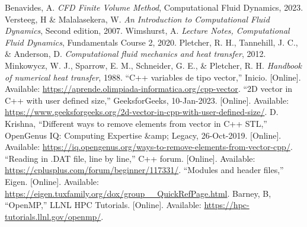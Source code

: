 \documentclass[article,latterpaper]{article}
\begin{document}
\begin{thebibliography}{}
 Benavides, A. \textit{CFD Finite Volume Method}, Computational Fluid Dynamics, 2023.
 Versteeg, H \& Malalasekera, W. \textit{An Introduction to Computational Fluid Dynamics}, Second edition, 2007.
 Wimshurst, A. \textit{Lecture Notes, Computational Fluid Dynamics}, Fundamentals Course 2, 2020.
 Pletcher, R. H., Tannehill, J. C., \& Anderson, D. \textit{Computational fluid mechanics and heat transfer}, 2012.
 Minkowycz, W. J., Sparrow, E. M., Schneider, G. E., \& Pletcher, R. H. \textit{Handbook of numerical heat transfer}, 1988.
 “C++ variables de tipo vector,” Inicio. [Online]. Available: \url{https://aprende.olimpiada-informatica.org/cpp-vector}.
 “2D vector in C++ with user defined size,” GeeksforGeeks, 10-Jan-2023. [Online]. Available: \url{https://www.geeksforgeeks.org/2d-vector-in-cpp-with-user-defined-size/}. 
 D. Krishna, “Different ways to remove elements from vector in C++ STL,” OpenGenus IQ: Computing Expertise \&amp; Legacy, 26-Oct-2019. [Online]. Available: \url{https://iq.opengenus.org/ways-to-remove-elements-from-vector-cpp/}. 
 “Reading in .DAT file, line by line,” C++ forum. [Online]. Available: \url{https://cplusplus.com/forum/beginner/117331/}.
 “Modules and header files,” Eigen. [Online]. Available: \url{https://eigen.tuxfamily.org/dox/group\_\_QuickRefPage.html}.
 Barney, B, “OpenMP,” LLNL HPC Tutorials. [Online]. Available: \url{https://hpc-tutorials.llnl.gov/openmp/}. 
\end{thebibliography}
\end{document}
